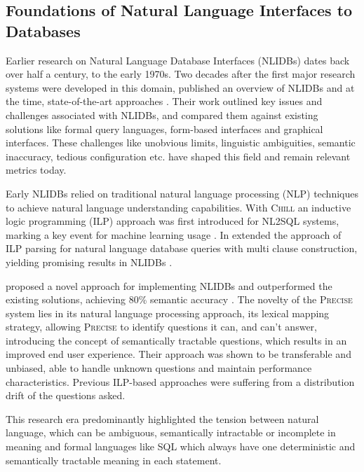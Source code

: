 \subsection{Foundations of Natural Language Interfaces to Databases}

Earlier research on Natural Language Database
Interfaces (NLIDBs) dates back over half a century, to the early 1970s. Two
decades after the first major research systems were developed in this domain,
\citeauthor*{NLIDBs} published an overview of NLIDBs and at the time,
state-of-the-art approaches \citep{NLIDBs}. Their work outlined key issues and
challenges associated with NLIDBs, and compared them against existing solutions
like formal query languages, form-based interfaces and graphical interfaces.
These challenges like unobvious limits, linguistic ambiguities, semantic
inaccuracy, tedious configuration etc. have shaped this field and remain
relevant metrics today.

Early NLIDBs relied on traditional natural language processing (NLP)
techniques to achieve natural language understanding capabilities.
With \textsc{Chill} an inductive logic programming (ILP) approach was first
introduced for NL2SQL systems, marking a key event for
machine learning usage \citep{ILPParsing}. In \citeyear{ILPParsing2}
\citeauthor*{ILPParsing2} extended the approach of ILP parsing for natural
language database queries with multi clause construction, yielding promising
results in NLIDBs \citep{ILPParsing2}.

\citeauthor{NLIDBTheory} proposed a novel approach for implementing NLIDBs and
outperformed the existing solutions, achieving 80\% semantic accuracy
\citep{NLIDBTheory}. The novelty of the \textsc{Precise} system lies in its
natural language processing approach, its lexical mapping strategy, allowing
\textsc{Precise} to identify questions it can, and can't answer, introducing
the concept of semantically tractable questions, which results in an improved
end user experience. Their approach was shown to be transferable and unbiased,
able to handle unknown questions and maintain performance characteristics.
Previous ILP-based approaches were suffering from a distribution drift of the
questions asked.

This research era predominantly highlighted the tension between natural
language, which can be ambiguous, semantically intractable or incomplete in
meaning and formal languages like SQL which always have one deterministic and
semantically tractable meaning in each statement.
